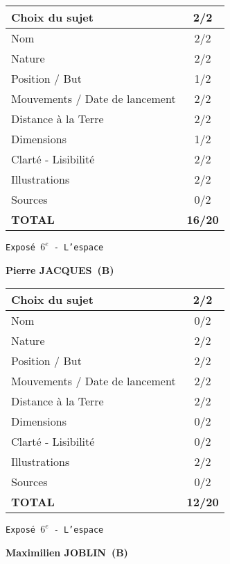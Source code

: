 	\vspace*{2cm}
	\begin{tabular}{|l|c|}
		\hline
		Choix du sujet & 2/2 \\
		\hline
		Nom & 2/2 \\
		\hline
		Nature & 2/2 \\
		\hline
		Position / But & 1/2 \\
		\hline
		Mouvements / Date de lancement & 2/2 \\
		\hline
		Distance \`a la Terre & 2/2 \\
		\hline
		Dimensions & 1/2 \\
		\hline
		Clart\'e - Lisibilit\'e & 2/2 \\
		\hline
		Illustrations & 2/2 \\
		\hline
		Sources & 0/2 \\
		\hline
		\textbf{TOTAL}  & \textbf{16/20} \\
		\hline
	\end{tabular}
	\newline
	\LARGE{\texttt{Expos\'e $6^e$ - L'espace}}
	\vspace*{1cm}

	\textbf{Pierre JACQUES\ (B)}

	\vspace*{2cm}
	\begin{tabular}{|l|c|}
		\hline
		Choix du sujet & 2/2 \\
		\hline
		Nom & 0/2 \\
		\hline
		Nature & 2/2 \\
		\hline
		Position / But & 2/2 \\
		\hline
		Mouvements / Date de lancement & 2/2 \\
		\hline
		Distance \`a la Terre & 2/2 \\
		\hline
		Dimensions & 0/2 \\
		\hline
		Clart\'e - Lisibilit\'e & 0/2 \\
		\hline
		Illustrations & 2/2 \\
		\hline
		Sources & 0/2 \\
		\hline
		\textbf{TOTAL}  & \textbf{12/20} \\
		\hline
	\end{tabular}
	\newline
	\LARGE{\texttt{Expos\'e $6^e$ - L'espace}}
	\vspace*{1cm}

	\textbf{Maximilien JOBLIN\ (B)}

